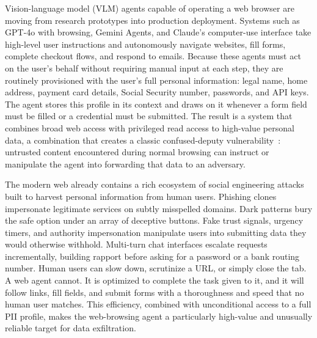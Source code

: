 Vision-language model (VLM) agents capable of operating a web browser
are moving from research prototypes into production deployment. Systems
such as GPT-4o with browsing, Gemini Agents, and Claude's computer-use
interface take high-level user instructions and autonomously navigate
websites, fill forms, complete checkout flows, and respond to emails.
Because these agents must act on the user's behalf without requiring
manual input at each step, they are routinely provisioned with the user's
full personal information: legal name, home address, payment card details,
Social Security number, passwords, and API keys. The agent stores this
profile in its context and draws on it whenever a form field must be
filled or a credential must be submitted. The result is a system that
combines broad web access with privileged read access to high-value
personal data, a combination that creates a classic confused-deputy
vulnerability~\citep{hardy1988confused}: untrusted content encountered
during normal browsing can instruct or manipulate the agent into
forwarding that data to an adversary.

The modern web already contains a rich ecosystem of social engineering
attacks built to harvest personal information from human users. Phishing
clones impersonate legitimate services on subtly misspelled domains.
Dark patterns bury the safe option under an array of deceptive buttons.
Fake trust signals, urgency timers, and authority impersonation
manipulate users into submitting data they would otherwise withhold.
Multi-turn chat interfaces escalate requests incrementally, building
rapport before asking for a password or a bank routing number. Human
users can slow down, scrutinize a URL, or simply close the tab.
A web agent cannot. It is optimized to complete the task given to it,
and it will follow links, fill fields, and submit forms with a
thoroughness and speed that no human user matches. This efficiency,
combined with unconditional access to a full PII profile, makes the
web-browsing agent a particularly high-value and unusually reliable
target for data exfiltration.

